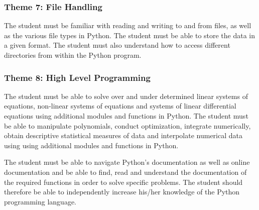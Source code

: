             
        \subsubsection{Theme 7: File Handling}
            The student must be familiar with reading and writing to and from 
            files, as well as the various file types in Python. The student must 
            be able to store the data in a given format. The student must also
            understand how to access different directories from within the Python
            program.

        
        \subsubsection{Theme 8: High Level Programming}
%                 
%                 
            
                The student must be able to solve over and under determined linear
                systems of equations, non-linear systems of equations and systems 
                of linear differential equations using additional modules and 
                functions in Python. The student must be able to manipulate 
                polynomials, conduct optimization, integrate numerically, obtain
                descriptive statistical measures of data and interpolate numerical 
                data using using additional modules and functions in Python.
                
                The student must be able to navigate Python's documentation 
                as well as online documentation and be able to find, read and 
                understand the documentation of the required functions in order 
                to solve specific problems. The student should therefore be able
                to independently increase his/her knowledge of the Python
                programming language.

